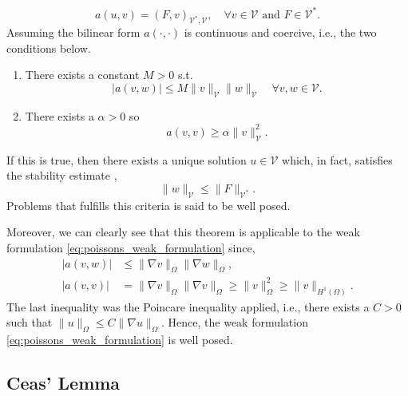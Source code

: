 \begin{equation*}
    a\left( u,v \right)  = \left( F, v \right) _{\mathcal{V} ^{*}, \mathcal{V} }, \quad \forall v \in  \mathcal{V} \text{ and } F \in \mathcal{V} ^{*}
.\end{equation*}
 Assuming the bilinear form $a\left( \cdot ,\cdot  \right) $  is continuous and coercive, i.e., the two conditions below.
\begin{enumerate}[label=\arabic*)]
    \item There exists a constant $M>0$ s.t. \[
    \left\lvert a\left( v,w \right)  \right\rvert \le M \| v \|_{ \mathcal{V}  }^{  } \| w \|_{ \mathcal{V}  }^{  }  \quad \forall v,w \in \mathcal{V}.
    \]
\item There exists a $\alpha  > 0$  so \[
a\left( v,v \right)  \ge  \alpha \| v \|_{ \mathcal{V}  }^{ 2 }.
\]
\end{enumerate}
If this is true, then there exists a unique solution $u \in \mathcal{V} $ which, in fact, satisfies the stability estimate \cite{manzoni2021optimal}, \[
\| w \|_{ \mathcal{V}   }^{  } \le  \| F \|_{ \mathcal{V} ^{*} }^{  }.
\]
Problems that fulfills this criteria is said to be well posed.

Moreover, we can clearly see that this theorem is applicable to the weak formulation \eqref{eq:poissons_weak_formulation} since,
\[
\begin{split}
    \left\lvert a\left( v,w \right)  \right\rvert & \le \| \nabla v \|_{ \Omega  }^{  } \| \nabla w \|_{ \Omega  }^{  }, \\
\left\lvert a\left( v,v \right)  \right\rvert  & = \|  \nabla v\|_{\Omega   }^{  }  \| \nabla v  \|_{\Omega   }^{  } \ge  \| v \|_{ \Omega  }^{ 2 } \ge \| v \|_{ H^{1}\left( \Omega  \right)  }^{  }.
\end{split}
\]
The last inequality was the Poincare inequality applied, i.e., there exists a $C>0$  such that $\| u \|_{ \Omega  }^{  } \le C  \| \nabla u \|_{\Omega   }^{  } $. Hence, the weak formulation \eqref{eq:poissons_weak_formulation} is well posed.

\subsection{Ceas' Lemma}%
\label{sub:ceas_lemma}

